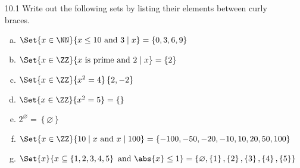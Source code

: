 \documentclass{article}
\begin{document}
\begin{enumerate}
\begin{enumerate}[a.]
		\end{enumerate}

		\newpage
	\item[10.1] Write out the following sets by listing their elements between curly braces.
		\begin{enumerate}[(a)]
			\item $\Set{x\in\NN}{x\le 10\text{ and } 3\mid x}=\left\{ 0, 3, 6, 9 \right\}$

			\item $\Set{x\in\ZZ}{x\text{ is prime and } 2\mid x}=\left\{ 2 \right\}$

			\item $\Set{x\in\ZZ}{x^2=4}\left\{ 2, -2 \right\}$

			\item $\Set{x\in\ZZ}{x^2=5}=\left\{  \right\}$

			\item $2^{\varnothing}=\left\{ \varnothing \right\}$

			\item $\Set{x\in\ZZ}{10\mid x\text{ and } x\mid 100 }=\left\{ -100, -50, -20, -10, 10, 20, 50, 100 \right\}$

			\item $\Set{x}{x\subseteq\left\{ 1, 2, 3, 4, 5 \right\}\text{ and }\abs{x}\le 1}=\left\{ \varnothing, \left\{ 1 \right\}, \left\{ 2 \right\}, \left\{ 3 \right\}, \left\{ 4 \right\}, \left\{ 5 \right\} \right\}$

		\end{enumerate}
		
\end{enumerate}
\end{document}
